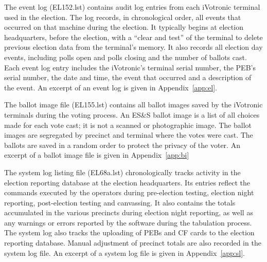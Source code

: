 The event log (EL152.lst) contains audit log entries from each
iVotronic terminal used in the election.  The log  records, in
chronological order, all events that occurred on that machine during the
election. It typically begins at election headquarters, before the
election, with a \textquotedblleft clear and
test\textquotedblright \hspace{1 mm} of the terminal to delete
previous election data from the terminal's memory. It also records all
election day events, including polls open and polls closing and the
number of ballots cast.  Each event log entry includes the iVotronic's
terminal serial number, the PEB's serial number, the date and time,
the event that occurred and a description of the event. An excerpt of
an event log is given in  Appendix~\ref{app:el}. 
 
The ballot image file (EL155.lst) contains all ballot images saved by
the iVotronic terminals during the voting process. An ES\&S ballot image
is a list of all choices made for each vote cast; it is not a scanned
or photographic image. The ballot images are segregated by precinct and
terminal where the votes were cast. The ballots are saved in a random
order to protect the privacy of the voter.  An excerpt of a ballot image
file is given in Appendix~\ref{app:bi}
 
The system log listing file (EL68a.lst) chronologically tracks activity
in the election reporting database at the election headquarters. Its
entries reflect the commands executed by the operators during
pre-election testing, election night reporting, post-election testing
and canvassing. It also contains the totals accumulated in the various
precincts during election night reporting, as well as any warnings or
errors reported by the software during the tabulation process.
The system log also tracks the uploading of PEBs and CF cards to the
election reporting database. Manual adjustment of precinct totals are
also recorded in the system log file. An excerpt of a system log file is
given in Appendix~\ref{app:sl}. 
